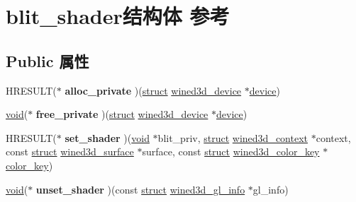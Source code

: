 \hypertarget{structblit__shader}{}\section{blit\+\_\+shader结构体 参考}
\label{structblit__shader}
\subsection*{Public 属性}
\begin{DoxyCompactItemize}
\item 
\mbox{\label{structblit__shader_a66a47a4bde4a9596aee288d8fef595be}} 
H\+R\+E\+S\+U\+LT($\ast$ {\bfseries alloc\+\_\+private} )(\hyperlink{interfacestruct}{struct} \hyperlink{structwined3d__device}{wined3d\+\_\+device} $\ast$\hyperlink{structdevice}{device})
\item 
\mbox{\label{structblit__shader_a4462cc9c1d71189a0d8ddfa579f22a41}} 
\hyperlink{interfacevoid}{void}($\ast$ {\bfseries free\+\_\+private} )(\hyperlink{interfacestruct}{struct} \hyperlink{structwined3d__device}{wined3d\+\_\+device} $\ast$\hyperlink{structdevice}{device})
\item 
\mbox{\label{structblit__shader_ac79283ab41e076ff7b5d80342abd3552}} 
H\+R\+E\+S\+U\+LT($\ast$ {\bfseries set\+\_\+shader} )(\hyperlink{interfacevoid}{void} $\ast$blit\+\_\+priv, \hyperlink{interfacestruct}{struct} \hyperlink{structwined3d__context}{wined3d\+\_\+context} $\ast$context, const \hyperlink{interfacestruct}{struct} \hyperlink{structwined3d__surface}{wined3d\+\_\+surface} $\ast$surface, const \hyperlink{interfacestruct}{struct} \hyperlink{structwined3d__color__key}{wined3d\+\_\+color\+\_\+key} $\ast$\hyperlink{structcolor__key}{color\+\_\+key})
\item 
\mbox{\label{structblit__shader_aca0c87fde6e941668435cef54fd6157e}} 
\hyperlink{interfacevoid}{void}($\ast$ {\bfseries unset\+\_\+shader} )(const \hyperlink{interfacestruct}{struct} \hyperlink{structwined3d__gl__info}{wined3d\+\_\+gl\+\_\+info} $\ast$gl\+\_\+info)
\item 
\mbox{\label{structblit__shader_a3422f96a3b797a69a545354ba28a69c0}} 

\end{DoxyCompactItemize}
